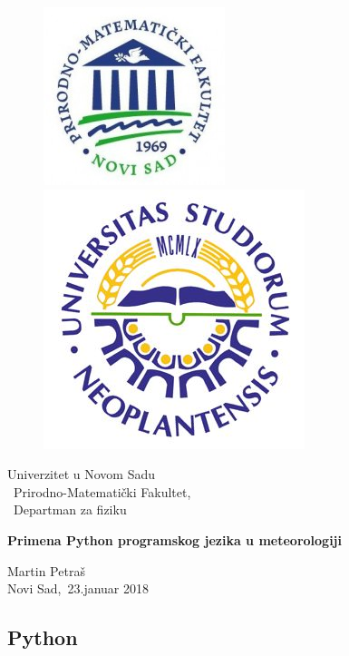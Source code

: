 \documentclass[12pt]{article}
\begin{document}
\clearpage
\begin{figure}\begin{center}
\includegraphics[scale=0.6]{PMF.jpg}	
\includegraphics[scale=0.4]{uns.jpg}
\end{center}
\end{figure}
\begin{center}
{\huge Univerzitet u Novom Sadu \\ \ Prirodno-Matematički Fakultet, \\ \ Departman za fiziku}
\end {center}
\begin{center}
\vspace{3.cm}
 {\Huge  \textbf{Primena Python programskog jezika u meteorologiji}}
\end {center}
\begin{center}
\vspace{5.cm}
 {\large  Martin Petraš \\ \vspace{0.5cm} Novi Sad,\ 23.januar 2018}
\end {center}
\newpage
\pagebreak
\begin{center}
\tableofcontents
\end{center}
\newpage
\pagebreak
{}
\begin{center}
\section*{Python}
\end{center}
\end{document}
